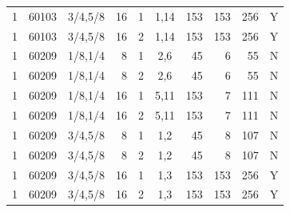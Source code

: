 \begin{longtable}{rrcrrcrrrc}
1 & 60103 & 3/4,5/8 & 16 & 1 & 1,14 & 153 & 153 & 256 & Y \\
1 & 60103 & 3/4,5/8 & 16 & 2 & 1,14 & 153 & 153 & 256 & Y \\
1 & 60209 & 1/8,1/4 & 8 & 1 & 2,6 & 45 & 6 & 55 & N \\
1 & 60209 & 1/8,1/4 & 8 & 2 & 2,6 & 45 & 6 & 55 & N \\
1 & 60209 & 1/8,1/4 & 16 & 1 & 5,11 & 153 & 7 & 111 & N \\
1 & 60209 & 1/8,1/4 & 16 & 2 & 5,11 & 153 & 7 & 111 & N \\
1 & 60209 & 3/4,5/8 & 8 & 1 & 1,2 & 45 & 8 & 107 & N \\
1 & 60209 & 3/4,5/8 & 8 & 2 & 1,2 & 45 & 8 & 107 & N \\
1 & 60209 & 3/4,5/8 & 16 & 1 & 1,3 & 153 & 153 & 256 & Y \\
1 & 60209 & 3/4,5/8 & 16 & 2 & 1,3 & 153 & 153 & 256 & Y \\
\hline
\end{longtable}
\endgroup
{}
\par\medskip
